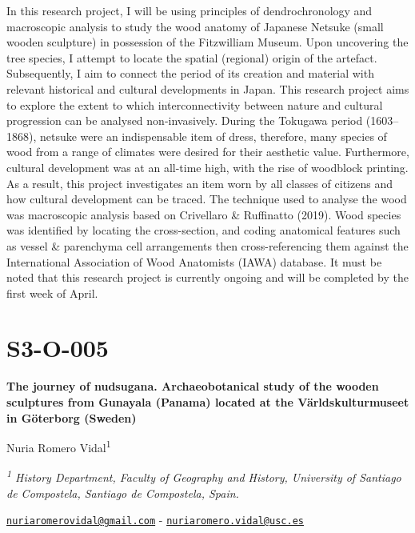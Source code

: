 \documentclass[
]{book}
\begin{document}
In this research project, I will be using principles of dendrochronology and macroscopic analysis to study the wood anatomy of Japanese Netsuke (small wooden sculpture) in possession of the Fitzwilliam Museum. Upon uncovering the tree species, I attempt to locate the spatial (regional) origin of the artefact. Subsequently, I aim to connect the period of its creation and material with relevant historical and cultural developments in Japan. This research project aims to explore the extent to which interconnectivity between nature and cultural progression can be analysed non-invasively. During the Tokugawa period (1603--1868), netsuke were an indispensable item of dress, therefore, many species of wood from a range of climates were desired for their aesthetic value. Furthermore, cultural development was at an all-time high, with the rise of woodblock printing. As a result, this project investigates an item worn by all classes of citizens and how cultural development can be traced. The technique used to analyse the wood was macroscopic analysis based on Crivellaro \& Ruffinatto (2019). Wood species was identified by locating the cross-section, and coding anatomical features such as vessel \& parenchyma cell arrangements then cross-referencing them against the International Association of Wood Anatomists (IAWA) database. It must be noted that this research project is currently ongoing and will be completed by the first week of April.

\hypertarget{s3-o-005}{%
\section*{S3-O-005}\label{s3-o-005}}

\textbf{The journey of nudsugana. Archaeobotanical study of the wooden sculptures from Gunayala (Panama) located at the Världskulturmuseet in Göterborg (Sweden)}

Nuria Romero Vidal\textsuperscript{1}

\emph{\textsuperscript{1} History Department, Faculty of Geography and History, University of Santiago de Compostela, Santiago de Compostela, Spain.}

\href{mailto:nuriaromerovidal@gmail.com}{\nolinkurl{nuriaromerovidal@gmail.com}} - \href{mailto:nuriaromero.vidal@usc.es}{\nolinkurl{nuriaromero.vidal@usc.es}}
\end{document}
